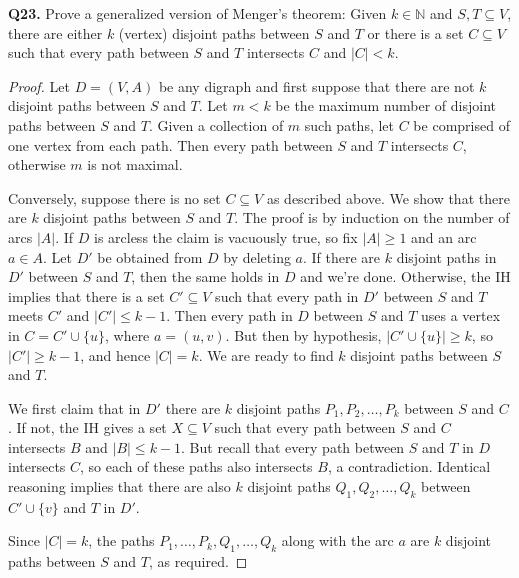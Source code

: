 \noindent \textbf{Q23.} Prove a generalized version of Menger's theorem: Given \( k \in \mathbb{N}  \) and \( S, T \subseteq V \), there are either \( k \) (vertex) disjoint paths between \( S \) and \( T \) or there is a set \( C \subseteq V \) such that every path between \( S \) and \( T \) intersects \( C \) and \( |C| < k \).
\begin{proof}
Let \( D = (V, A) \) be any digraph and first suppose that there are not \( k \) disjoint paths between \( S \) and \( T \). Let \( m < k \) be the maximum number of disjoint paths between \( S \) and \( T \). Given a collection of \( m \) such paths, let \( C \) be comprised of one vertex from each path. Then every path between \( S \) and \( T \) intersects \( C \), otherwise \( m \) is not maximal.

Conversely, suppose there is no set \( C \subseteq V\) as described above. We show that there are \( k \) disjoint paths between \( S \) and \( T \). The proof is by induction on the number of arcs \( |A| \). If \( D \) is arcless the claim is vacuously true, so fix \( |A| \geq 1 \) and an arc \( a \in A \). Let \( D' \) be obtained from \( D \) by deleting \( a \). If there are \( k \) disjoint paths in \( D' \) between \( S \) and \( T \), then the same holds in \( D \) and we're done. Otherwise, the IH implies that there is a set \( C' \subseteq V \) such that every path in \( D' \) between \( S \) and \( T \) meets \( C' \) and \( |C'| \leq k - 1 \). Then every path in \( D \) between \( S \) and \( T \) uses a vertex in \( C = C' \cup \{ u \}  \), where \( a = (u, v) \). But then by hypothesis, \( |C' \cup \{ u \}| \geq k \), so \( |C'| \geq k - 1 \), and hence \( |C| = k \). We are ready to find \( k \) disjoint paths between \( S \) and \( T \).

We first claim that in \( D' \) there are \( k \) disjoint paths \( P_1, P_2, \hdots , P_{k}  \) between \( S \) and \( C \). If not, the IH gives a set \( X \subseteq V \) such that every path between \( S \) and \( C \) intersects \( B \) and \( |B| \leq k - 1 \). But recall that every path between \( S \) and \( T \) in \( D \) intersects \( C \), so each of these paths also intersects \( B \), a contradiction. Identical reasoning implies that there are also \( k \) disjoint paths \( Q_1, Q_2, \hdots , Q_{k}  \) between \( C' \cup \{ v \}  \) and \( T \) in \( D' \).

Since \( |C| = k \), the paths \( P_1, \hdots , P_{k}, Q_1, \hdots , Q_{k} \) along with the arc \( a \) are \( k \) disjoint paths between \( S \) and \( T \), as required.
\end{proof}
